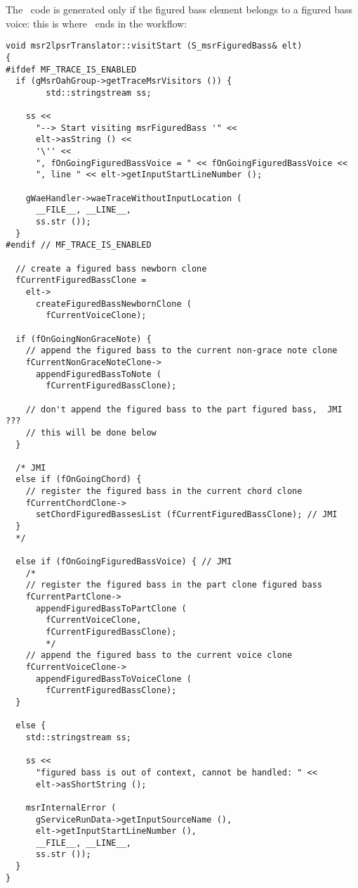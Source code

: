 The \lily\ code is generated only if the figured bass element belongs to a figured bass voice: this is where \denorm\ ends in the workflow:%
\begin{lstlisting}[language=CPlusPlus]
void msr2lpsrTranslator::visitStart (S_msrFiguredBass& elt)
{
#ifdef MF_TRACE_IS_ENABLED
  if (gMsrOahGroup->getTraceMsrVisitors ()) {
		std::stringstream ss;

    ss <<
      "--> Start visiting msrFiguredBass '" <<
      elt->asString () <<
      '\'' <<
      ", fOnGoingFiguredBassVoice = " << fOnGoingFiguredBassVoice <<
      ", line " << elt->getInputStartLineNumber ();

    gWaeHandler->waeTraceWithoutInputLocation (
      __FILE__, __LINE__,
      ss.str ());
  }
#endif // MF_TRACE_IS_ENABLED

  // create a figured bass newborn clone
  fCurrentFiguredBassClone =
    elt->
      createFiguredBassNewbornClone (
        fCurrentVoiceClone);

  if (fOnGoingNonGraceNote) {
    // append the figured bass to the current non-grace note clone
    fCurrentNonGraceNoteClone->
      appendFiguredBassToNote (
      	fCurrentFiguredBassClone);

    // don't append the figured bass to the part figured bass,  JMI ???
    // this will be done below
  }

  /* JMI
  else if (fOnGoingChord) {
    // register the figured bass in the current chord clone
    fCurrentChordClone->
      setChordFiguredBassesList (fCurrentFiguredBassClone); // JMI
  }
  */

  else if (fOnGoingFiguredBassVoice) { // JMI
    /*
    // register the figured bass in the part clone figured bass
    fCurrentPartClone->
      appendFiguredBassToPartClone (
        fCurrentVoiceClone,
        fCurrentFiguredBassClone);
        */
    // append the figured bass to the current voice clone
    fCurrentVoiceClone->
      appendFiguredBassToVoiceClone (
        fCurrentFiguredBassClone);
  }

  else {
    std::stringstream ss;

    ss <<
      "figured bass is out of context, cannot be handled: " <<
      elt->asShortString ();

    msrInternalError (
      gServiceRunData->getInputSourceName (),
      elt->getInputStartLineNumber (),
      __FILE__, __LINE__,
      ss.str ());
  }
}
\end{lstlisting}

